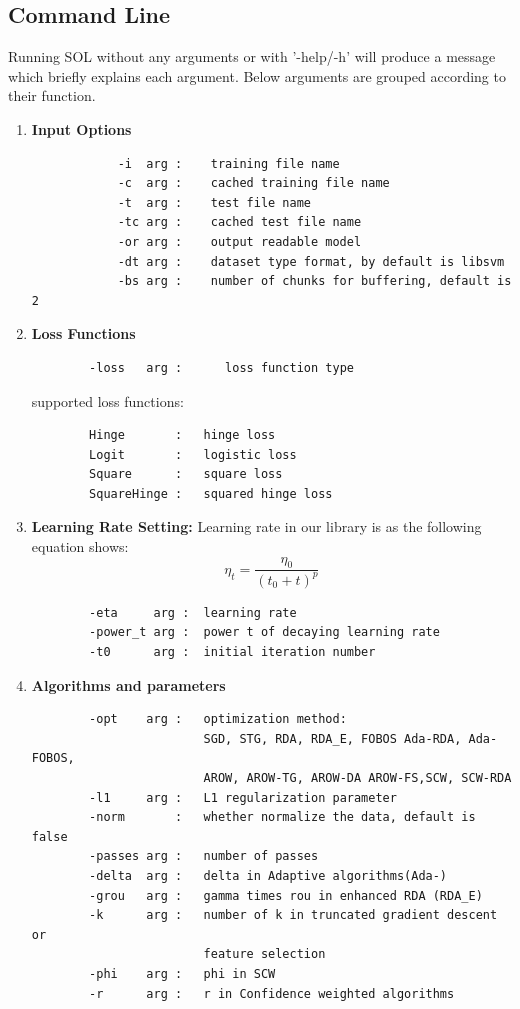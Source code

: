 \documentclass[11pt,a4paper]{article}
\newlength{\wideitemsep}
\let\olditem\item
\renewcommand{\item}{\setlength{\itemsep}{\wideitemsep}\olditem}
\begin{document}
\subsection{Command Line}
Running SOL without any arguments or with '-help/-h' will produce a message which briefly explains each argument. Below arguments are grouped according to their function.

\begin{enumerate}
    \item \textbf{Input Options}
        \begin{lstlisting}
            -i  arg :    training file name
            -c  arg :    cached training file name
            -t  arg :    test file name
            -tc arg :    cached test file name
            -or arg :    output readable model
            -dt arg :    dataset type format, by default is libsvm 
            -bs arg :    number of chunks for buffering, default is 2
        \end{lstlisting}

    \item \textbf{Loss Functions}
        \begin{lstlisting}
        -loss   arg :      loss function type
        \end{lstlisting}

        supported loss functions: 
        \begin{lstlisting}
        Hinge       :   hinge loss
        Logit       :   logistic loss
        Square      :   square loss
        SquareHinge :   squared hinge loss
        \end{lstlisting}

    \item \textbf{Learning Rate Setting:} Learning rate in our library is as the following equation shows:
        \begin{equation}
            \eta_t=\frac{\eta_0}{(t_0+t)^p}
            \label{equ:lrate}
        \end{equation}

        
        \begin{lstlisting}
        -eta     arg :  learning rate
        -power_t arg :  power t of decaying learning rate
        -t0      arg :  initial iteration number
        \end{lstlisting}

    \item \textbf{Algorithms and parameters}
        \begin{lstlisting}
        -opt    arg :   optimization method: 
                        SGD, STG, RDA, RDA_E, FOBOS Ada-RDA, Ada-FOBOS, 
                        AROW, AROW-TG, AROW-DA AROW-FS,SCW, SCW-RDA
        -l1     arg :   L1 regularization parameter
        -norm       :   whether normalize the data, default is false
        -passes arg :   number of passes 
        -delta  arg :   delta in Adaptive algorithms(Ada-)
        -grou   arg :   gamma times rou in enhanced RDA (RDA_E)
        -k      arg :   number of k in truncated gradient descent or 
                        feature selection
        -phi    arg :   phi in SCW
        -r      arg :   r in Confidence weighted algorithms
        \end{lstlisting}


\end{enumerate}
\end{document}
